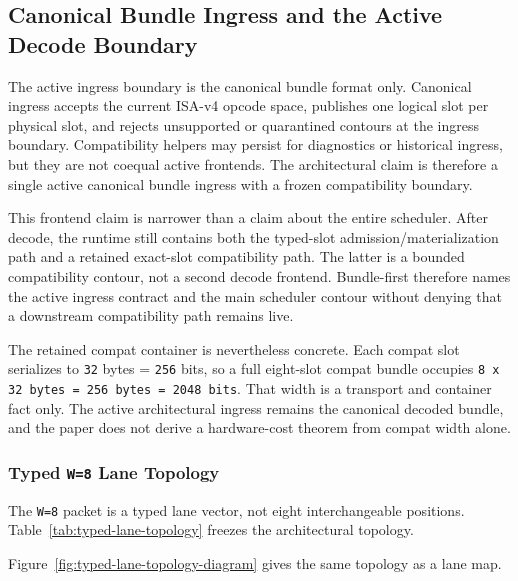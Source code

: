 \documentclass[twocolumn]{article}
\begin{document}
\subsection{Canonical Bundle Ingress and the Active Decode Boundary}

The active ingress boundary is the canonical bundle format only. Canonical ingress accepts the current ISA-v4 opcode space, publishes one logical slot per physical slot, and rejects unsupported or quarantined contours at the ingress boundary. Compatibility helpers may persist for diagnostics or historical ingress, but they are not coequal active frontends. The architectural claim is therefore a single active canonical bundle ingress with a frozen compatibility boundary.

This frontend claim is narrower than a claim about the entire scheduler. After decode, the runtime still contains both the typed-slot admission/materialization path and a retained exact-slot compatibility path. The latter is a bounded compatibility contour, not a second decode frontend. Bundle-first therefore names the active ingress contract and the main scheduler contour without denying that a downstream compatibility path remains live.

The retained compat container is nevertheless concrete. Each compat slot serializes to \texttt{32} bytes = \texttt{256} bits, so a full eight-slot compat bundle occupies \texttt{8 x 32 bytes = 256 bytes = 2048 bits}. That width is a transport and container fact only. The active architectural ingress remains the canonical decoded bundle, and the paper does not derive a hardware-cost theorem from compat width alone.


\subsubsection{Typed \texttt{W=8} Lane Topology}

The \texttt{W=8} packet is a typed lane vector, not eight interchangeable positions. Table~\ref{tab:typed-lane-topology} freezes the architectural topology.



Figure~\ref{fig:typed-lane-topology-diagram} gives the same topology as a lane map.


\end{document}
